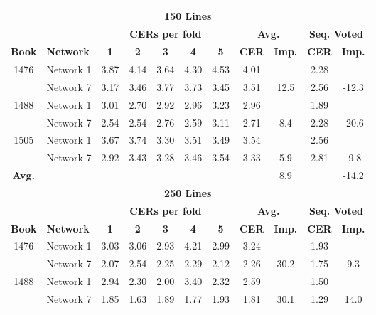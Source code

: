 \documentclass{jlcl}
\begin{document}
\begin{table}[tp]
\begin{tabular}{c|l|ccccc|cc|cc}
        \hline
        \multicolumn{11}{c}{\textbf{150 Lines}} \\
        \hline
        \hline
             &       &\multicolumn{5}{c|}{\textbf{CERs per fold}} & \multicolumn{2}{c}{\textbf{Avg.}} & \multicolumn{2}{c}{\textbf{Seq. Voted}} \\
        \hline
        \textbf{Book} & \textbf{Network} & \textbf{1} & \textbf{2} & \textbf{3} & \textbf{4} & \textbf{5} & \textbf{CER} & \textbf{Imp.} & \textbf{CER} & \textbf{Imp.} \\
        \hline
        1476 & Network 1 & 3.87 & 4.14 & 3.64 & 4.30 & 4.53 & 4.01 &      & 2.28 &       \\
             & Network 7 & 3.17 & 3.46 & 3.77 & 3.73 & 3.45 & 3.51 & 12.5 & 2.56 & -12.3 \\
        1488 & Network 1 & 3.01 & 2.70 & 2.92 & 2.96 & 3.23 & 2.96 &      & 1.89 &       \\
             & Network 7 & 2.54 & 2.54 & 2.76 & 2.59 & 3.11 & 2.71 &  8.4 & 2.28 & -20.6 \\
        1505 & Network 1 & 3.67 & 3.74 & 3.30 & 3.51 & 3.49 & 3.54 &      & 2.56 &       \\
             & Network 7 & 2.92 & 3.43 & 3.28 & 3.46 & 3.54 & 3.33 &  5.9 & 2.81 &  -9.8 \\
        \hline
        \textbf{Avg.} &         &      &      &      &      &      &      &  8.9 &      & -14.2 \\
        \hline
        \hline
        \multicolumn{11}{c}{\textbf{250 Lines}} \\
        \hline
        \hline
             &       &\multicolumn{5}{c|}{\textbf{CERs per fold}} & \multicolumn{2}{c}{\textbf{Avg.}} & \multicolumn{2}{c}{\textbf{Seq. Voted}} \\
        \hline
        \textbf{Book} & \textbf{Network} & \textbf{1} & \textbf{2} & \textbf{3} & \textbf{4} & \textbf{5} & \textbf{CER} & \textbf{Imp.} & \textbf{CER} & \textbf{Imp.} \\
        \hline
        1476 & Network 1 & 3.03 & 3.06 & 2.93 & 4.21 & 2.99 & 3.24 &      & 1.93 &       \\
             & Network 7 & 2.07 & 2.54 & 2.25 & 2.29 & 2.12 & 2.26 & 30.2 & 1.75 &   9.3 \\
        1488 & Network 1 & 2.94 & 2.30 & 2.00 & 3.40 & 2.32 & 2.59 &      & 1.50 &       \\
             & Network 7 & 1.85 & 1.63 & 1.89 & 1.77 & 1.93 & 1.81 & 30.1 & 1.29 &  14.0 \\

\end{tabular}
\end{table}
\end{document}
